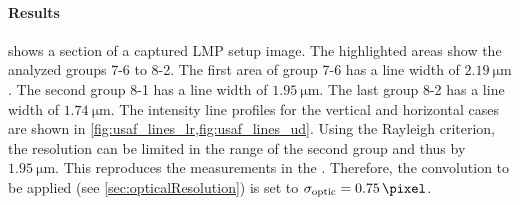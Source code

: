 \paragraph{Results}
 shows a section of a captured \ac{LMP} setup image.
The highlighted areas show the analyzed groups 7-6 to 8-2.
The first area of group 7-6  has a line width of $\SI{2.19}{\micro\meter}$.
The second group 8-1  has a line width of $\SI{1.95}{\micro\meter}$.
The last group 8-2  has a line width of $\SI{1.74}{\micro\meter}$.
The intensity line profiles for the vertical and horizontal cases are shown in \cref{fig:usaf_lines_lr,fig:usaf_lines_ud}.
% 
Using the Rayleigh criterion, the resolution can be limited in the range of the second group and thus by $\SI{1.95}{\micro\meter}$.
This reproduces the measurements in the \cite{MenzelMaster}.
Therefore, the convolution to be applied (see \cref{sec:opticalResolution}) is set to $\opticsigma = \SI{0.75}{\pixel}$.
% 
% 
% 
